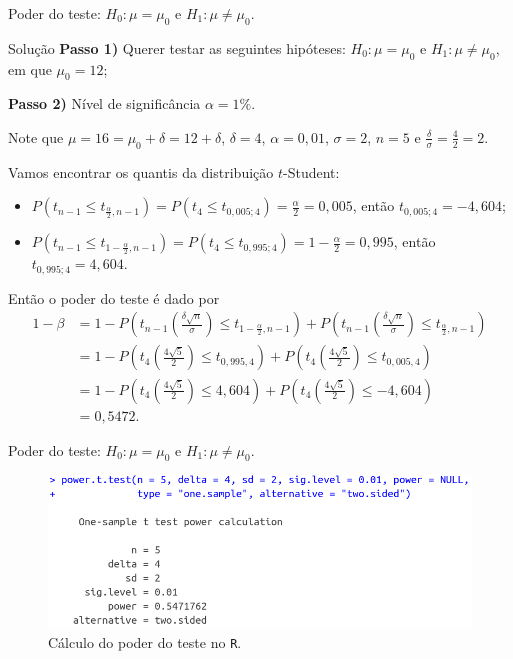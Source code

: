 \documentclass[8pt]{beamer}
\begin{document}
\begin{frame}{Poder do teste: $H_0:\mu = \mu_0$ e $H_1: \mu \neq \mu_0$.}


\begin{block}{Solução}
	\textbf{Passo 1)} Querer testar as seguintes hipóteses: $H_0: \mu = \mu_0$ e $H_1: \mu \neq \mu_0$, em que $\mu_0=12$;
	
	\textbf{Passo 2)} Nível de significância $\alpha=1\%$.
	
	
	Note que $\mu=16=\mu_0+\delta=12+\delta$, $\delta=4$, $\alpha=0,01$, $\sigma=2$, $n=5$ e $\frac{\delta}{\sigma} = \frac{4}{2}=2$.
	
	Vamos encontrar os quantis da distribuição $t$-Student:
	\begin{itemize}
		\item $P(t_{n-1} \leq t_{\frac{\alpha}{2}, n-1} ) = P(t_{4} \leq t_{0,005; 4} ) = \frac{\alpha}{2} = 0,005$, então $t_{0,005; 4}=-4,604$;
		\item $P(t_{n-1} \leq t_{1-\frac{\alpha}{2}, n-1} ) = P(t_{4} \leq t_{0,995; 4} ) =1- \frac{\alpha}{2} = 0,995$, então $t_{0,995; 4}=4,604$.
	\end{itemize}
	
	Então o poder do teste é dado por
	\begin{align*}
		1-\beta &= 1 - P\left( t_{n-1}\left(\frac{\delta\sqrt{n}}{\sigma}\right) \leq t_{1-\frac{\alpha}{2}, n-1} \right) + P\left( t_{n-1}\left(\frac{\delta\sqrt{n}}{\sigma}\right) \leq t_{\frac{\alpha}{2}, n-1} \right)\\
		&= 1 - P\left( t_{4}\left(\frac{4\sqrt{5}}{2}\right) \leq t_{0,995, 4} \right) + P\left( t_{4}\left(\frac{4\sqrt{5}}{2}\right) \leq t_{0,005, 4} \right)\\
		&= 1 - P\left( t_{4}\left(\frac{4\sqrt{5}}{2}\right) \leq 4,604 \right) + P\left( t_{4}\left(\frac{4\sqrt{5}}{2}\right) \leq -4,604 \right)\\
		&= 0,5472.
	\end{align*} 
\end{block}

\end{frame}




\begin{frame}{Poder do teste: $H_0:\mu = \mu_0$ e $H_1: \mu \neq \mu_0$.}

\begin{figure}[htbp]
	\centering
	\caption{Cálculo do poder do teste no \texttt{R}.}
	\includegraphics[width=0.9\linewidth]{figures/t-noncentral-power.png}
\end{figure}

\end{frame}
\end{document}
